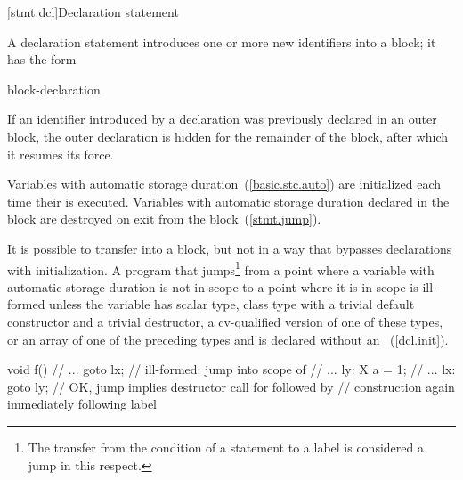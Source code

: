 [stmt.dcl]{Declaration statement}%

\pnum
A declaration statement introduces one or more new identifiers into a
block; it has the form

\begin{bnf}
\br
    block-declaration
\end{bnf}

If an identifier introduced by a declaration was previously declared in
an outer block,
%
%
%
the outer declaration is hidden for the remainder of the block, after
which it resumes its force.

\pnum
{}%
%
Variables with automatic storage duration~(\ref{basic.stc.auto}) are
initialized each time their  is executed.
%
Variables with automatic storage duration declared in the block are
destroyed on exit from the block~(\ref{stmt.jump}).

\pnum
{}%
%
It is possible to transfer into a block, but not in a way that bypasses
declarations with initialization. A program that jumps\footnote{The transfer from the condition of a  statement to a
 label is considered a jump in this respect.}
from a point where a variable with automatic storage duration is
not in scope to a point where it is in scope is ill-formed unless the
variable has scalar type, class type with a trivial default constructor and a trivial destructor, a cv-qualified version of one of these types, or an array of one of the preceding types and is declared without an
~(\ref{dcl.init}).
\begin{example}

\begin{codeblock}
void f() {
  // ... 
  goto lx;          // ill-formed: jump into scope of 
  // ...
ly:
  X a = 1;
  // ...
lx:
  goto ly;          // OK, jump implies destructor call for  followed by
                    // construction again immediately following label 
}
\end{codeblock}
\end{example}


